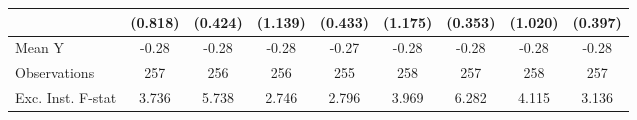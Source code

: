 {\begin{tabular}{l*{8}{c}}
                    &     (0.818)         &     (0.424)         &     (1.139)         &     (0.433)         &     (1.175)         &     (0.353)         &     (1.020)         &     (0.397)         \\
\midrule
Mean Y              &       -0.28         &       -0.28         &       -0.28         &       -0.27         &       -0.28         &       -0.28         &       -0.28         &       -0.28         \\
Observations        &         257         &         256         &         256         &         255         &         258         &         257         &         258         &         257         \\
Exc. Inst. F-stat   &       3.736         &       5.738         &       2.746         &       2.796         &       3.969         &       6.282         &       4.115         &       3.136         \\
\bottomrule
\end{tabular}
}
